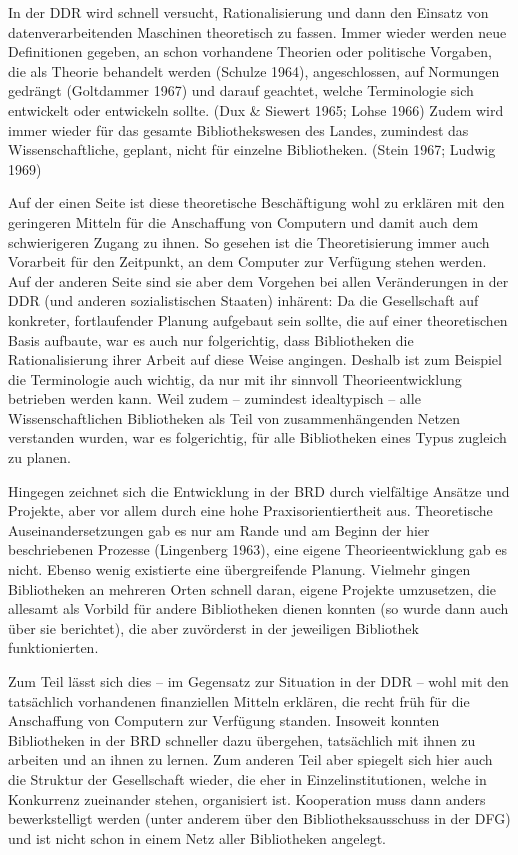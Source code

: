 \documentclass[a4paper,
fontsize=11pt,
oneside,
numbers=noperiodatend,
parskip=half-,
bibliography=totoc,
final
]{scrartcl}
\begin{document}
In der DDR wird schnell versucht, Rationalisierung und dann den Einsatz
von datenverarbeitenden Maschinen theoretisch zu fassen. Immer wieder
werden neue Definitionen gegeben, an schon vorhandene Theorien oder
politische Vorgaben, die als Theorie behandelt werden (Schulze 1964),
angeschlossen, auf Normungen gedrängt (Goltdammer 1967) und darauf
geachtet, welche Terminologie sich entwickelt oder entwickeln sollte.
(Dux \& Siewert 1965; Lohse 1966) Zudem wird immer wieder für das
gesamte Bibliothekswesen des Landes, zumindest das Wissenschaftliche,
geplant, nicht für einzelne Bibliotheken. (Stein 1967; Ludwig 1969)

Auf der einen Seite ist diese theoretische Beschäftigung wohl zu
erklären mit den geringeren Mitteln für die Anschaffung von Computern
und damit auch dem schwierigeren Zugang zu ihnen. So gesehen ist die
Theoretisierung immer auch Vorarbeit für den Zeitpunkt, an dem Computer
zur Verfügung stehen werden. Auf der anderen Seite sind sie aber dem
Vorgehen bei allen Veränderungen in der DDR (und anderen sozialistischen
Staaten) inhärent: Da die Gesellschaft auf konkreter, fortlaufender
Planung aufgebaut sein sollte, die auf einer theoretischen Basis
aufbaute, war es auch nur folgerichtig, dass Bibliotheken die
Rationalisierung ihrer Arbeit auf diese Weise angingen. Deshalb ist zum
Beispiel die Terminologie auch wichtig, da nur mit ihr sinnvoll
Theorieentwicklung betrieben werden kann. Weil zudem -- zumindest
idealtypisch -- alle Wissenschaftlichen Bibliotheken als Teil von
zusammenhängenden Netzen verstanden wurden, war es folgerichtig, für
alle Bibliotheken eines Typus zugleich zu planen.

Hingegen zeichnet sich die Entwicklung in der BRD durch vielfältige
Ansätze und Projekte, aber vor allem durch eine hohe
Praxisorientiertheit aus. Theoretische Auseinandersetzungen gab es nur
am Rande und am Beginn der hier beschriebenen Prozesse (Lingenberg
1963), eine eigene Theorieentwicklung gab es nicht. Ebenso wenig
existierte eine übergreifende Planung. Vielmehr gingen Bibliotheken an
mehreren Orten schnell daran, eigene Projekte umzusetzen, die allesamt
als Vorbild für andere Bibliotheken dienen konnten (so wurde dann auch
über sie berichtet), die aber zuvörderst in der jeweiligen Bibliothek
funktionierten.

Zum Teil lässt sich dies -- im Gegensatz zur Situation in der DDR --
wohl mit den tatsächlich vorhandenen finanziellen Mitteln erklären, die
recht früh für die Anschaffung von Computern zur Verfügung standen.
Insoweit konnten Bibliotheken in der BRD schneller dazu übergehen,
tatsächlich mit ihnen zu arbeiten und an ihnen zu lernen. Zum anderen
Teil aber spiegelt sich hier auch die Struktur der Gesellschaft wieder,
die eher in Einzelinstitutionen, welche in Konkurrenz zueinander stehen,
organisiert ist. Kooperation muss dann anders bewerkstelligt werden
(unter anderem über den Bibliotheksausschuss in der DFG) und ist nicht
schon in einem Netz aller Bibliotheken angelegt.
\end{document}
